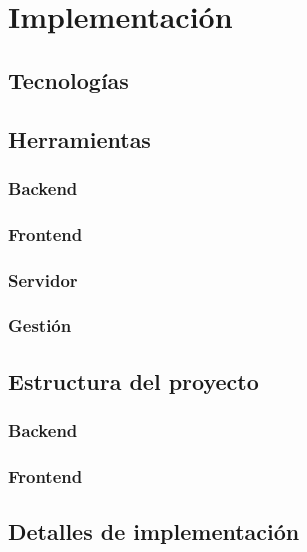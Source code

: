 
\chapter{Implementación}\label{implementacion}
\section{Tecnologías}\label{sec:tecnologia}

\section{Herramientas}\label{sec:herramientas}

\subsection{Backend}

\subsection{Frontend}

\subsection{Servidor}

\subsection{Gestión}

\section{Estructura del proyecto}\label{sec:estructra_proyecto}

\subsection{Backend}

\subsection{Frontend}

\section{Detalles de implementación}\label{sec:detalles_implementacion}